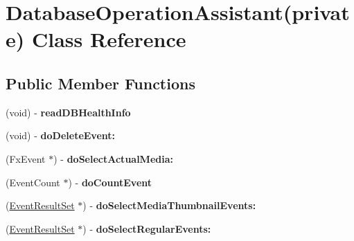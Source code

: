 \hypertarget{interface_database_operation_assistant_07private_08}{
\section{\-Database\-Operation\-Assistant(private) \-Class \-Reference}
\label{interface_database_operation_assistant_07private_08}
}
\subsection*{\-Public \-Member \-Functions}
\begin{DoxyCompactItemize}
\item 
\hypertarget{interface_database_operation_assistant_07private_08_a9824b08b96d719e277fb475ee5055979}{
(void) -\/ {\bfseries read\-D\-B\-Health\-Info}}
\label{interface_database_operation_assistant_07private_08_a9824b08b96d719e277fb475ee5055979}

\item 
\hypertarget{interface_database_operation_assistant_07private_08_afa23fe34b43111ff54fba6424d8cf245}{
(void) -\/ {\bfseries do\-Delete\-Event\-:}}
\label{interface_database_operation_assistant_07private_08_afa23fe34b43111ff54fba6424d8cf245}

\item 
\hypertarget{interface_database_operation_assistant_07private_08_a64ad7e7cf53df5d729fdad16e1d6e954}{
(\-Fx\-Event $\ast$) -\/ {\bfseries do\-Select\-Actual\-Media\-:}}
\label{interface_database_operation_assistant_07private_08_a64ad7e7cf53df5d729fdad16e1d6e954}

\item 
\hypertarget{interface_database_operation_assistant_07private_08_a1bc28db68d5c35ad072a2c8005c95431}{
(\-Event\-Count $\ast$) -\/ {\bfseries do\-Count\-Event}}
\label{interface_database_operation_assistant_07private_08_a1bc28db68d5c35ad072a2c8005c95431}

\item 
\hypertarget{interface_database_operation_assistant_07private_08_a5b7b365c413e88147e614e3f1268a7f0}{
(\hyperlink{interface_event_result_set}{\-Event\-Result\-Set} $\ast$) -\/ {\bfseries do\-Select\-Media\-Thumbnail\-Events\-:}}
\label{interface_database_operation_assistant_07private_08_a5b7b365c413e88147e614e3f1268a7f0}

\item 
\hypertarget{interface_database_operation_assistant_07private_08_af16add1628b44c231a33df6d431e3f4f}{
(\hyperlink{interface_event_result_set}{\-Event\-Result\-Set} $\ast$) -\/ {\bfseries do\-Select\-Regular\-Events\-:}}
\label{interface_database_operation_assistant_07private_08_af16add1628b44c231a33df6d431e3f4f}


\end{DoxyCompactItemize}
